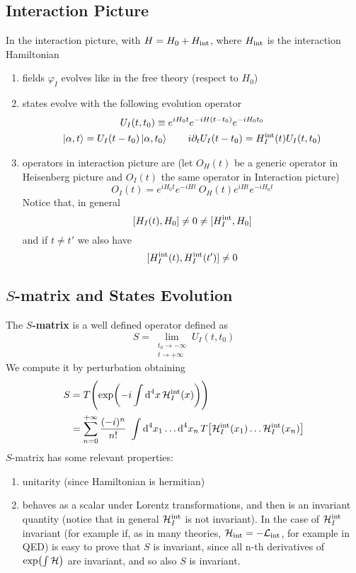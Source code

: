 \documentclass[TheoreticalPhy_ModB.tex]{subfiles}
\begin{document}
\subsection{Interaction Picture}
In the interaction picture, with $H = H_0 + H_{\textup{int}}$, where $H_{\textup{int}}$ is the interaction Hamiltonian
\begin{enumerate}
\item fields $\varphi_I$ evolves like in the free theory (respect to $H_0$)
\item states evolve with the following evolution operator 
	\begin{gather}
	U_I(t, t_0) \equiv e^{iH_0t} e^{-iH(t-t_0)} e^{-iH_0t_0} \notag \\
	\ket{\alpha, t} = U_I (t - t_0) \ket{\alpha, t_0}
	\qquad
	i \partial_t U_I (t-t_0) = H_I^{\textup{int}}(t) U_I(t, t_0) \notag
	\end{gather}
\item operators in interaction picture are (let $O_H(t)$ be a generic operator in Heisenberg picture and $O_I(t)$ the same operator in Interaction picture)
	\[O_I(t) = e^{iH_0t}e^{-iHt} \ O_H(t) e^{iHt} e^{-iH_0t}\]
	Notice that, in general
	\[[H_I(t), H_0] \ne 0 \ne [H_I^{\textup{int}}, H_0]\]
	and if $t \ne t'$ we also have
	\[[H_I^{\textup{int}}(t), H_I^{\textup{int}}(t')] \ne 0\]
\end{enumerate}

\subsection{$S$-matrix and States Evolution}

The \textbf{$S$-matrix} is a well defined operator defined as
\[S = \lim_{\substack{t_0 \to -\infty \\ t \to +\infty}} U_I(t, t_0)\]
We compute it by perturbation obtaining
\[\begin{split}
S 	& = T \Biggl( \exp \biggl( -i \int \textup{d}^4 x \,\mathcal{H}_I^{\textup{int}}(x) \biggr) \Biggr) \\
	& = \sum_{n=0}^{+\infty} \frac{(-i)^n}{n!} \ \int \textup{d}^4 x_1 \dots \textup{d}^4 x_n \, T\big[\mathcal{H}_I^{\textup{int}}(x_1) \dots \mathcal{H}_I^{\textup{int}}(x_n)\big]
\end{split}\]
$S$-matrix has some relevant properties:
\begin{enumerate}
\item{unitarity (since Hamiltonian is hermitian)}
\item{behaves as a scalar under Lorentz transformations, and then is an invariant quantity (notice that in general }$\mathcal{H}_I^{\textup{int}}$ is not invariant).
In the case of $\mathcal{H}_I^{\textup{int}}$ invariant (for example if, as in many theories, $\mathcal{H}_{\textup{int}} = -\mathcal{L}_{\textup{int}}$, for example in QED) is easy to prove that $S$ is invariant, since all n-th derivatives of $\exp( \int \mathcal{H})$ are invariant, and so also $S$ is invariant.
\end{enumerate}
\end{document}
